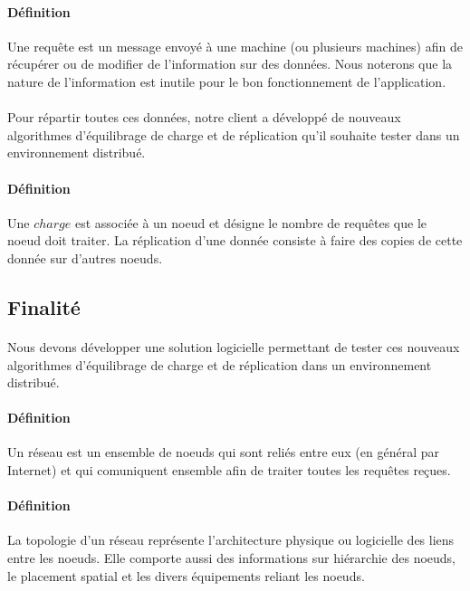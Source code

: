 \documentclass[12pt]{article}
\begin{document}
\paragraph{Définition} Une requête est un message envoyé à une machine (ou plusieurs machines) afin de récupérer ou de modifier de l'information sur des données.
Nous noterons que la nature de l'information est inutile pour le bon fonctionnement de l'application.

\paragraph{} Pour répartir toutes ces données, notre client a développé de nouveaux algorithmes d'équilibrage de charge et de réplication qu'il souhaite tester dans un environnement distribué.

\paragraph{Définition} Une $charge$ est associée à un noeud et désigne le nombre de requêtes que le noeud doit traiter. La réplication d'une donnée consiste à faire des copies de cette donnée sur d'autres noeuds.

\subsection{Finalité}

\paragraph{} Nous devons développer une solution logicielle permettant de tester ces nouveaux algorithmes d'équilibrage de charge et de réplication dans un environnement distribué.

\paragraph{Définition} Un réseau est un ensemble de noeuds qui sont reliés entre eux (en général par Internet) et qui comuniquent ensemble afin de traiter toutes les requêtes reçues.

\paragraph{Définition} La topologie d'un réseau représente l'architecture physique ou logicielle des liens entre les noeuds. Elle comporte aussi des informations sur 
 hiérarchie des noeuds, le placement spatial et les divers équipements reliant les noeuds.
\end{document}
